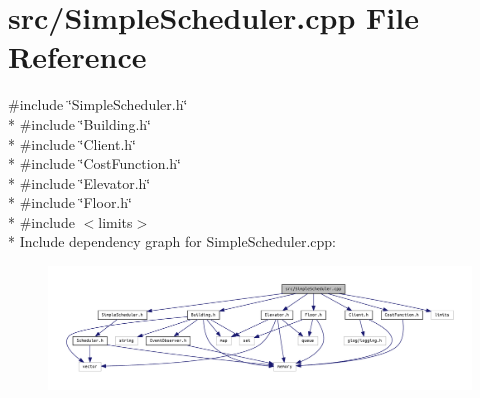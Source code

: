 \section{src/\+Simple\+Scheduler.cpp File Reference}
\label{_simple_scheduler_8cpp}
{\ttfamily \#include \char`\"{}Simple\+Scheduler.\+h\char`\"{}}\\*
{\ttfamily \#include \char`\"{}Building.\+h\char`\"{}}\\*
{\ttfamily \#include \char`\"{}Client.\+h\char`\"{}}\\*
{\ttfamily \#include \char`\"{}Cost\+Function.\+h\char`\"{}}\\*
{\ttfamily \#include \char`\"{}Elevator.\+h\char`\"{}}\\*
{\ttfamily \#include \char`\"{}Floor.\+h\char`\"{}}\\*
{\ttfamily \#include $<$limits$>$}\\*
Include dependency graph for Simple\+Scheduler.\+cpp\+:\nopagebreak
\begin{figure}[H]
\begin{center}
\leavevmode
\includegraphics[width=350pt]{_simple_scheduler_8cpp__incl}
\end{center}
\end{figure}
